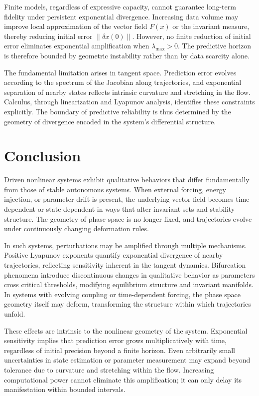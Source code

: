 \documentclass[12pt]{book}
\begin{document}
Finite models, regardless of expressive capacity, cannot guarantee long-term fidelity under persistent exponential divergence. Increasing data volume may improve local approximation of the vector field $F(x)$ or the invariant measure, thereby reducing initial error $\|\delta x(0)\|$. However, no finite reduction of initial error eliminates exponential amplification when $\lambda_{\max} > 0$. The predictive horizon is therefore bounded by geometric instability rather than by data scarcity alone.

The fundamental limitation arises in tangent space. Prediction error evolves according to the spectrum of the Jacobian along trajectories, and exponential separation of nearby states reflects intrinsic curvature and stretching in the flow. Calculus, through linearization and Lyapunov analysis, identifies these constraints explicitly. The boundary of predictive reliability is thus determined by the geometry of divergence encoded in the system's differential structure.

\section{Conclusion}

Driven nonlinear systems exhibit qualitative behaviors that differ fundamentally from those of stable autonomous systems. When external forcing, energy injection, or parameter drift is present, the underlying vector field becomes time-dependent or state-dependent in ways that alter invariant sets and stability structure. The geometry of phase space is no longer fixed, and trajectories evolve under continuously changing deformation rules.

In such systems, perturbations may be amplified through multiple mechanisms. Positive Lyapunov exponents quantify exponential divergence of nearby trajectories, reflecting sensitivity inherent in the tangent dynamics. Bifurcation phenomena introduce discontinuous changes in qualitative behavior as parameters cross critical thresholds, modifying equilibrium structure and invariant manifolds. In systems with evolving coupling or time-dependent forcing, the phase space geometry itself may deform, transforming the structure within which trajectories unfold.

These effects are intrinsic to the nonlinear geometry of the system. Exponential sensitivity implies that prediction error grows multiplicatively with time, regardless of initial precision beyond a finite horizon. Even arbitrarily small uncertainties in state estimation or parameter measurement may expand beyond tolerance due to curvature and stretching within the flow. Increasing computational power cannot eliminate this amplification; it can only delay its manifestation within bounded intervals.
\end{document}
